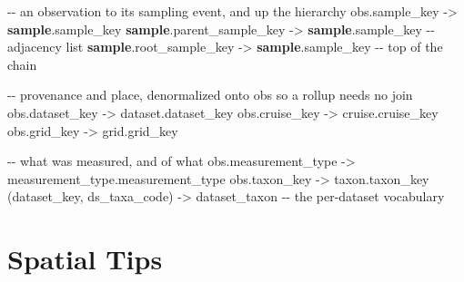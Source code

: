\documentclass[
  letterpaper,
  DIV=11,
  numbers=noendperiod]{scrreprt}
\newenvironment{Shaded}{\begin{snugshade}}{\end{snugshade}}
\newcommand{\CommentTok}[1]{\textcolor[rgb]{0.37,0.37,0.37}{#1}}
\newcommand{\KeywordTok}[1]{\textcolor[rgb]{0.00,0.23,0.31}{\textbf{#1}}}
\newcommand{\NormalTok}[1]{\textcolor[rgb]{0.00,0.23,0.31}{#1}}
\newcommand{\OperatorTok}[1]{\textcolor[rgb]{0.37,0.37,0.37}{#1}}
\begin{document}
\begin{Shaded}
\begin{Highlighting}[]
\CommentTok{{-}{-} an observation to its sampling event, and up the hierarchy}
\NormalTok{obs.sample\_key        }\OperatorTok{{-}\textgreater{}} \KeywordTok{sample}\NormalTok{.sample\_key}
\KeywordTok{sample}\NormalTok{.parent\_sample\_key }\OperatorTok{{-}\textgreater{}} \KeywordTok{sample}\NormalTok{.sample\_key      }\CommentTok{{-}{-} adjacency list}
\KeywordTok{sample}\NormalTok{.root\_sample\_key   }\OperatorTok{{-}\textgreater{}} \KeywordTok{sample}\NormalTok{.sample\_key      }\CommentTok{{-}{-} top of the chain}

\CommentTok{{-}{-} provenance and place, denormalized onto obs so a rollup needs no join}
\NormalTok{obs.dataset\_key       }\OperatorTok{{-}\textgreater{}}\NormalTok{ dataset.dataset\_key}
\NormalTok{obs.cruise\_key        }\OperatorTok{{-}\textgreater{}}\NormalTok{ cruise.cruise\_key}
\NormalTok{obs.grid\_key          }\OperatorTok{{-}\textgreater{}}\NormalTok{ grid.grid\_key}

\CommentTok{{-}{-} what was measured, and of what}
\NormalTok{obs.measurement\_type  }\OperatorTok{{-}\textgreater{}}\NormalTok{ measurement\_type.measurement\_type}
\NormalTok{obs.taxon\_key         }\OperatorTok{{-}\textgreater{}}\NormalTok{ taxon.taxon\_key}
\NormalTok{(dataset\_key, ds\_taxa\_code) }\OperatorTok{{-}\textgreater{}}\NormalTok{ dataset\_taxon       }\CommentTok{{-}{-} the per{-}dataset vocabulary}
\end{Highlighting}
\end{Shaded}

\section{Spatial Tips}\label{spatial-tips}
\end{document}
